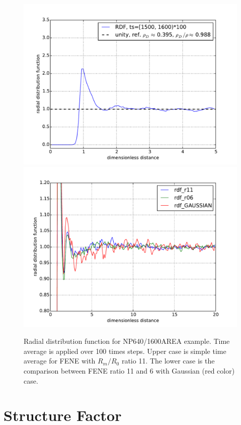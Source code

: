 \documentclass[10pt, a4paper]{report}
\begin{document}
\begin{appendices}
    \begin{figure}
      \centering
      \includegraphics[width=\textwidth]{figures/rdf_exam.pdf}\\
      \includegraphics[width=\textwidth]{figures/rdf_compare.pdf}
      \caption{Radial distribution function for NP640/1600AREA example. Time average is applied over 100 times steps. Upper case is simple time average for FENE with $R_m/R_0$ ratio 11. The lower case is the comparison between FENE ratio 11 and 6 with Gaussian (red color) case.}
      \label{fig:rdf_exam}
    \end{figure}
    
    \section{Structure Factor}

\end{appendices}
\end{document}
